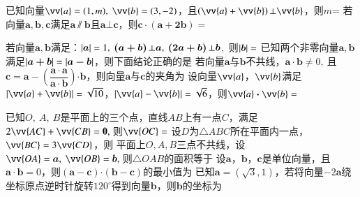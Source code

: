 \documentclass{BHCexam}
\newcommand{\xl}[2]{\vv{#1}\bm\cdot\vv{#2}}
\begin{document}
\fubiaoti{}
\maketitle
\begin{questions}

\qs
已知向量$ \vv{a}=(1,m),~\vv{b}=(3,-2) $，且$\left(\vv{a}+\vv{b}\right)\bot \vv{b} $，则$m$=\xx
{}
\qs 若向量$ \bm{a,b,c} $满足$ \bm{a}\sslash\bm{b} $且$ \bm{a}\bot\bm{c} $，则$ \bm{c\cdot\left(a+2b\right)} =$\xx
{}

\qs 若向量$ \bm{a,b} $满足：$ \left| \bm{a} \right|=1,~\bm{\left(a+b\right)}\bot \bm{a},~\bm{\left(2a+b\right)}\bot \bm{b} $,~则$ \left| \bm{b} \right|= $\xx
{}
\qs 已知两个非零向量$\bm{ a,b}$满足$ \left| \bm{a+b} \right|=\left| \bm{a-b} \right| $，则下面结论正确的是\xx
{}
\qs 若向量$ \bm{a} $与$ \bm{b} $不共线，$ \bm{a}\cdot \bm{b}\ne 0,~ $且$\bm{c}=\bm{a}-\left(\dfrac{\bm{a\cdot a}}{\bm{a\cdot b}}\right)\bm{\cdot b} $，则向量$ \bm{a} $与$ \bm{c} $的夹角为\xx
{}
\qs
设向量$\vv{a}$，$\vv{b}$满足$\left|\vv{a}+\vv{b}\right|=\sqrt{10}$，$\left|\vv{a}-\vv{b}\right|=\sqrt{6}$，则$\xl{a}{b}=$\xx
{}


\qs 已知$ O,~A,~B $是平面上的三个点，直线$ AB $上有一点$ C $，满足$ 2\vv{AC}+\vv{CB}=\mathbf{0}, ~$则$ \vv{OC}= $\xx
{}
\qs 设$ D $为$\triangle ABC$所在平面内一点，$ \vv{BC}=3\vv{CD} $，则\xx
{}
\qs 平面上$ O,A,B $三点不共线，设$ \vv{OA}=\bm{a},~\vv{OB}=\bm{b},~ $则$ \triangle OAB $的面积等于\xx
{}
\qs 设$\bm{a}$，$\bm{b}$，$\bm{c}$是单位向量，且$ \bm{a\cdot b} =0$，则$ \left(\bm{a-c}\right)\bm{\cdot}\left(\bm{b-c}\right) $的最小值为\xx
{}
\qs 已知$ \bm{a}=(\sqrt{3},1) $，若将向量$ -2\bm{a} $绕坐标原点逆时针旋转$ 120^{\circ} $得到向量$ \bm{b} $，则$ \bm{b} $的坐标为\xx
{}


\end{questions}
\end{document}
